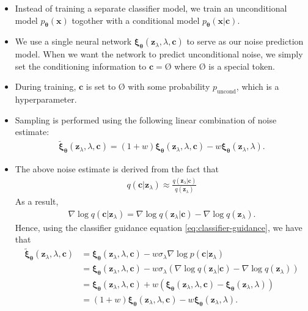 \documentclass[10pt]{article}
\newcommand{\ve}[1]{\mathbf{#1}}
\newcommand{\mrm}[1]{\mathrm{#1}}
\newcommand{\ves}[1]{\boldsymbol{#1}}
\begin{document}
\begin{itemize}
  \item Instead of training a separate classifier model, we train an unconditional model $p_{\ves{\theta}}(\ve{x})$ togother with a conditional model $p_{\ves{\theta}}(\ve{x}|\ve{c})$.
  
  \item We use a single neural network $\ve{\xi}_{\ves{\theta}}(\ve{z}_\lambda, \lambda, \ve{c})$ to serve as our noise prediction model. When we want the network to predict unconditional noise, we simply set the conditioning information to $\ve{c} = \mbox{\O}$ where $\mbox{\O}$ is a special token.
  
  \item During training, $\ve{c}$ is set to $\mbox{\O}$ with some probability $p_{\mrm{uncond}}$, which is a hyperparameter.
  
  \item Sampling is performed using the following linear combination of noise estimate:
  \begin{align*}
    \widetilde{\ves{\xi}}_{\ves{\theta}}(\ve{z}_\lambda, \lambda, \ve{c})
    = (1 + w) \ves{\xi}_{\ves{\theta}}(\ve{z}_\lambda, \lambda, \ve{c}) - w \ves{\xi}_{\ves{\theta}}(\ve{z}_\lambda, \lambda).
  \end{align*}

  \item The above noise estimate is derived from the fact that
  \begin{align*}
    q(\ve{c}| \ve{z}_\lambda) \approx \frac{q(\ve{z}_\lambda | \ve{c})}{q(\ve{z}_\lambda)}
  \end{align*}
  As a result,
  \begin{align*}
    \nabla \log q(\ve{c}|\ve{z}_\lambda) = \nabla \log q(\ve{z}_\lambda|\ve{c}) - \nabla \log q(\ve{z}_\lambda).
  \end{align*}
  Hence, using the classifier guidance equation \eqref{eq:classifier-guidance}, we have that
  \begin{align*}
    \widetilde{\ves{\xi}}_{\ves{\theta}}(\ve{z}_\lambda, \lambda, \ve{c})
    &= \ves{\xi}_{\ves{\theta}}(\ve{z}_\lambda, \lambda, \ve{c}) - w\sigma_\lambda \nabla \log p(\ve{c}|\ve{z}_\lambda) \\
    &= \ves{\xi}_{\ves{\theta}}(\ve{z}_\lambda, \lambda, \ve{c}) - w\sigma_\lambda (\nabla \log q(\ve{z}_\lambda|\ve{c}) - \nabla \log q(\ve{z}_\lambda) ) \\
    &= \ves{\xi}_{\ves{\theta}}(\ve{z}_\lambda, \lambda, \ve{c}) + w ( \ves{\xi}_{\ves{\theta}}(\ve{z}_\lambda, \lambda, \ve{c}) - \ves{\xi}_{\ves{\theta}}(\ve{z}_\lambda, \lambda) ) \\
    &= (1 + w) \ves{\xi}_{\ves{\theta}}(\ve{z}_\lambda, \lambda, \ve{c}) - w \ves{\xi}_{\ves{\theta}}(\ve{z}_\lambda, \lambda).
  \end{align*}
\end{itemize}
\end{document}
